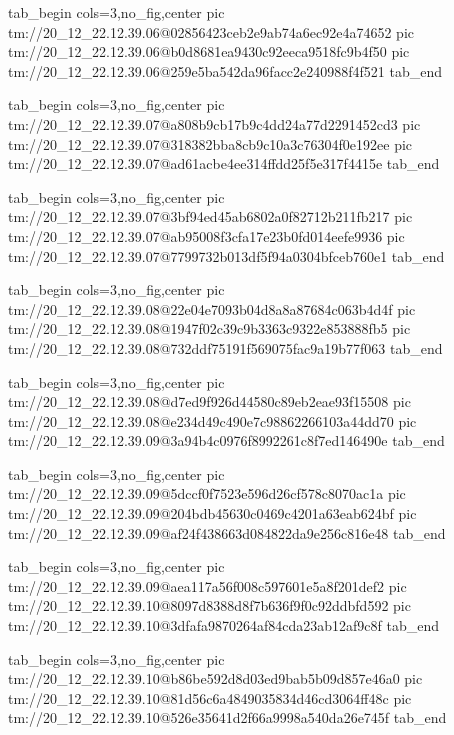  
 
 
 
 

\qqSecCmtScr


\ifcmt
  tab_begin cols=3,no_fig,center
    pic tm://20_12_22.12.39.06@02856423ceb2e9ab74a6ec92e4a74652
    pic tm://20_12_22.12.39.06@b0d8681ea9430c92eeca9518fc9b4f50
    pic tm://20_12_22.12.39.06@259e5ba542da96facc2e240988f4f521
  tab_end
\fi


\ifcmt
  tab_begin cols=3,no_fig,center
    pic tm://20_12_22.12.39.07@a808b9cb17b9c4dd24a77d2291452cd3
    pic tm://20_12_22.12.39.07@318382bba8cb9c10a3c76304f0e192ee
    pic tm://20_12_22.12.39.07@ad61acbe4ee314ffdd25f5e317f4415e
  tab_end
\fi


\ifcmt
  tab_begin cols=3,no_fig,center
    pic tm://20_12_22.12.39.07@3bf94ed45ab6802a0f82712b211fb217
    pic tm://20_12_22.12.39.07@ab95008f3cfa17e23b0fd014eefe9936
    pic tm://20_12_22.12.39.07@7799732b013df5f94a0304bfceb760e1
  tab_end
\fi


\ifcmt
  tab_begin cols=3,no_fig,center
    pic tm://20_12_22.12.39.08@22e04e7093b04d8a8a87684c063b4d4f
    pic tm://20_12_22.12.39.08@1947f02c39c9b3363c9322e853888fb5
    pic tm://20_12_22.12.39.08@732ddf75191f569075fac9a19b77f063
  tab_end
\fi


\ifcmt
  tab_begin cols=3,no_fig,center
    pic tm://20_12_22.12.39.08@d7ed9f926d44580c89eb2eae93f15508
    pic tm://20_12_22.12.39.08@e234d49c490e7c98862266103a44dd70
    pic tm://20_12_22.12.39.09@3a94b4c0976f8992261c8f7ed146490e
  tab_end
\fi


\ifcmt
  tab_begin cols=3,no_fig,center
    pic tm://20_12_22.12.39.09@5dccf0f7523e596d26cf578c8070ac1a
    pic tm://20_12_22.12.39.09@204bdb45630c0469c4201a63eab624bf
    pic tm://20_12_22.12.39.09@af24f438663d084822da9e256c816e48
  tab_end
\fi


\ifcmt
  tab_begin cols=3,no_fig,center
    pic tm://20_12_22.12.39.09@aea117a56f008c597601e5a8f201def2
    pic tm://20_12_22.12.39.10@8097d8388d8f7b636f9f0c92ddbfd592
    pic tm://20_12_22.12.39.10@3dfafa9870264af84cda23ab12af9c8f
  tab_end
\fi


\ifcmt
  tab_begin cols=3,no_fig,center
    pic tm://20_12_22.12.39.10@b86be592d8d03ed9bab5b09d857e46a0
    pic tm://20_12_22.12.39.10@81d56c6a4849035834d46cd3064ff48c
    pic tm://20_12_22.12.39.10@526e35641d2f66a9998a540da26e745f
  tab_end
\fi


